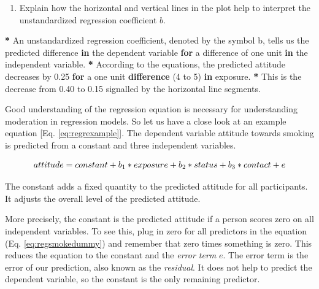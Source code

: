\documentclass[a4paper]{book}
\newenvironment{Shaded}{\begin{snugshade}}{\end{snugshade}}
\newcommand{\KeywordTok}[1]{\textcolor[rgb]{0,0,0}{\textbf{#1}}}
\newcommand{\DecValTok}[1]{\textcolor[rgb]{0.00,0.00,0.00}{#1}}
\newcommand{\FloatTok}[1]{\textcolor[rgb]{0.00,0.00,0.00}{#1}}
\newcommand{\StringTok}[1]{\textcolor[rgb]{0.00,0.00,0.00}{#1}}
\newcommand{\ControlFlowTok}[1]{\textcolor[rgb]{0.00,0.00,0.00}{\textbf{#1}}}
\newcommand{\OperatorTok}[1]{\textcolor[rgb]{0.00,0.00,0.00}{\textbf{#1}}}
\newcommand{\NormalTok}[1]{#1}
\providecommand{\tightlist}{%
  \setlength{\itemsep}{0pt}\setlength{\parskip}{0pt}}
\theoremstyle{definition}
\theoremstyle{definition}
\theoremstyle{definition}
\theoremstyle{remark}
\begin{document}
\begin{enumerate}
\def\labelenumi{\arabic{enumi}.}
\setcounter{enumi}{1}
\tightlist
\item
  Explain how the horizontal and vertical lines in the plot help to
  interpret the unstandardized regression coefficient \(b\).
\end{enumerate}

\begin{Shaded}
\begin{Highlighting}[]
\OperatorTok{*}\StringTok{ }\NormalTok{An unstandardized regression coefficient, denoted by the symbol b, tells us}
\NormalTok{the predicted difference }\ControlFlowTok{in}\NormalTok{ the dependent variable }\ControlFlowTok{for}\NormalTok{ a difference of one unit }\ControlFlowTok{in}\NormalTok{ the}
\NormalTok{independent variable.}
\OperatorTok{*}\StringTok{ }\NormalTok{According to the equations, the predicted attitude decreases by }\FloatTok{0.25} \ControlFlowTok{for}\NormalTok{ a one}
\NormalTok{unit }\KeywordTok{difference}\NormalTok{ (}\DecValTok{4}\NormalTok{ to }\DecValTok{5}\NormalTok{) }\ControlFlowTok{in}\NormalTok{ exposure.}
\OperatorTok{*}\StringTok{ }\NormalTok{This is the decrease from }\FloatTok{0.40}\NormalTok{ to }\FloatTok{0.15}\NormalTok{ signalled by the horizontal line}
\NormalTok{segments.}
\end{Highlighting}
\end{Shaded}

Good understanding of the regression equation is necessary for
understanding moderation in regression models. So let us have a close
look at an example equation {[}Eq. \eqref{eq:regrexample}{]}. The
dependent variable attitude towards smoking is predicted from a constant
and three independent variables.

\begin{equation}
\small
  attitude = constant + b_1*exposure + b_2*status + b_3*contact + e 
  \label{eq:regrexample} 
\normalsize
\end{equation}

The constant adds a fixed quantity to the predicted attitude for all
participants. It adjusts the overall level of the predicted attitude.

More precisely, the constant is the predicted attitude if a person
scores zero on all independent variables. To see this, plug in zero for
all predictors in the equation (Eq. \eqref{eq:regsmokedummy}) and remember
that zero times something is zero. This reduces the equation to the
constant and the \emph{error term} \(e\). The error term is the error of
our prediction, also known as the \emph{residual}. It does not help to
predict the dependent variable, so the constant is the only remaining
predictor.
\end{document}
